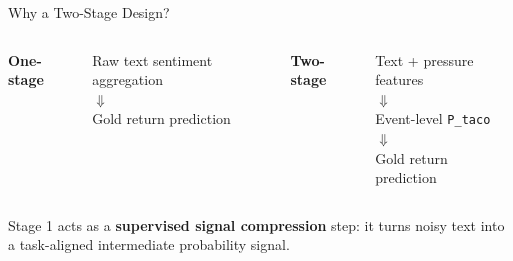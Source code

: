 \begin{frame}{Why a Two-Stage Design?}
  \begin{columns}[T,onlytextwidth]
      \centering
      {\bfseries\Large One-stage\par}
      \vspace{0.4em}
      Raw text sentiment aggregation\\[0.5em]
      $\Downarrow$\\[0.5em]
      Gold return prediction

      \centering
      {\color{orange!90!black}\bfseries\Large Two-stage\par}
      \vspace{0.4em}
      Text + pressure features\\[0.4em]
      $\Downarrow$\\[0.45em]
      Event-level \texttt{P\_taco}\\[0.4em]
      $\Downarrow$\\[0.45em]
      Gold return prediction
  \end{columns}

  \vspace{0.6em}
  \small
  Stage 1 acts as a \textbf{supervised signal compression} step: it turns noisy text into a task-aligned intermediate probability signal.
\end{frame}
